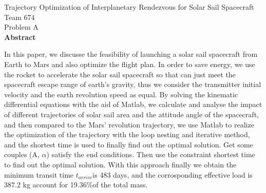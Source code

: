 \documentclass[UTF8,a4paper,12pt,twoside]{article}
\begin{document}
 

\begin{titlepage}
	\vspace*{20mm}
	\begin{center}
		{ Trajectory Optimization of Interplanetary Rendezvous for Solar Sail Spacecraft  } \\[10mm]
		{ Team 674 } \\[5mm] %
		{ Problem A } \\[6mm] %
		{\bfseries {} Abstract } \\[3mm]
	\end{center}
	In this paper, we discusse the feasibility of launching a solar sail spacecraft from Earth to Mars and also optimize the flight plan. In order to save energy, we use the rocket to accelerate the solar sail spacecraft so that can just meet the spacecraft escape range of earth's gravity, thus we consider the transmitter initial velocity and the earth revolution speed as equal. By solving the kinematic differential equations with the aid of Matlab, we calculate and analyse the impact of different trajectories of solar sail area and the attitude angle of the spacecraft, and then compared to the Mars' revolution trajectory, we use Matlab to realize the optimization of the trajectory with the loop nesting and iterative method, and the shortest time is used to finally find out the optimal solution. Get some couples (A, $\alpha$) satisfy the end conditions. Then use the constraint shortest time to find out the optimal solution.  With this approach finally we obtain the minimum transit time $t_{arrive}$is 483 days, and the corrosponding effective load is 387.2 kg account for 19.36$\%$of the total mass. 
\end{titlepage}

\tableofcontents %

\newpage
\begin{spacing}{1.5} %


%
%



\newpage


\newpage


\end{spacing}
\end{document}
